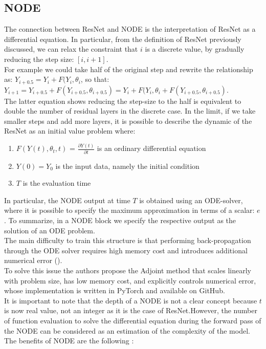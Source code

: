 \documentclass[LaM,binding=0.6cm]{sapthesis}
\begin{document}
\subsection{NODE}
The connection between ResNet and NODE is the interpretation of ResNet as a differential equation. In particular, from the definition of ResNet previously discussed, we can relax the constraint that $i$ is a discrete value, by gradually reducing the step size: $[i,i+1]$.\\For example we could take half of the original step and rewrite the relationship as: $Y_{i+0.5} = Y_{i} +F(Y_{i},\theta_{i}$, so that: $Y_{i+1} = Y_{i+0.5} +F(Y_{i+0.5},\theta_{i+0.5}) = Y_{i} + F(Y_{i},\theta_{i} + F(Y_{i+0.5},\theta_{i+0.5})$.\\The latter equation shows reducing the step-size to the half is equivalent to double the number of residual layers in the discrete case. In the limit, if we take smaller steps and add more layers, it is possible to describe the dynamic of the ResNet as an initial value problem where: 
\begin{enumerate}
\item $F(Y(t),\theta_{t},t)$ = $\frac{\partial Y(t)}{ \partial t}$ is an ordinary differential equation
\item $Y(0)=Y_0$ is the input data, namely the initial condition
\item $T$ is the evaluation time 
\end{enumerate}
In particular, the NODE output at time $T$ is obtained using an ODE-solver, where it is possible to specify the maximum approximation in terms of a scalar: $e$. To summarize, in a NODE block we specify the respective output as the solution of an ODE problem.\\The main difficulty to train this structure is that performing back-propagation through the ODE solver requires high memory cost and introduces additional numerical error (\cite{DBLP:journals/corr/abs-1806-07366}).\\To solve this issue the authors propose the Adjoint method that scales linearly with problem size, has low memory cost, and explicitly controls numerical error, whose implementation is written in PyTorch and available on GitHub.\\It is important to note that the depth of a NODE is not a clear concept because $t$ is now real value, not an integer as it is the case of ResNet.However, the number of function evaluation to solve the differential equation during the forward pass of the NODE can be considered as an estimation of the complexity of the model.\\The benefits of NODE are the following :
\end{document}
